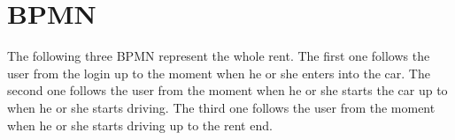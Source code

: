 \section{BPMN}
The following three BPMN represent the whole rent. The first one follows the user from the login up to the moment when he or she enters into the car. The second one follows the user from the moment when he or she starts the car up to when he or she starts driving. The third one follows the user from the moment when he or she starts driving up to the rent end.


